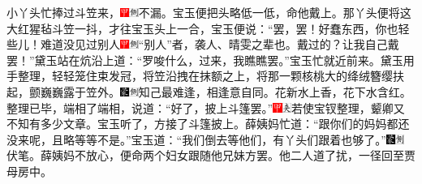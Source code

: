 小丫头忙捧过斗笠来，{\includegraphics[width=3mm]{../Images/00002}\includegraphics[width=3mm]{../Images/00011}\footnotesize \kaishu 不漏。}宝玉便把头略低一低，命他戴上。那丫头便将这大红猩毡斗笠一抖，才往宝玉头上一合，宝玉便说：“罢，罢！好蠢东西，你也轻些儿！难道没见过别人{\includegraphics[width=3mm]{../Images/00002}\includegraphics[width=3mm]{../Images/00011}\footnotesize \kaishu “别人”者，袭人、晴雯之辈也。}戴过的？让我自己戴罢！”黛玉站在炕沿上道：“罗唆什么，过来，我瞧瞧罢。”宝玉忙就近前来。黛玉用手整理，轻轻笼住束发冠，将笠沿拽在抹额之上，将那一颗核桃大的绛绒簪缨扶起，颤巍巍露于笠外。{\includegraphics[width=3mm]{../Images/00006}\includegraphics[width=3mm]{../Images/00011}\footnotesize \kaishu 知己最难逢，相逢意自同。花新水上香，花下水含红。}整理已毕，端相了端相，说道：“好了，披上斗篷罢。”{\includegraphics[width=3mm]{../Images/00002}\includegraphics[width=3mm]{../Images/00012}\footnotesize \kaishu 若使宝钗整理，颦卿又不知有多少文章。}宝玉听了，方接了斗篷披上。薛姨妈忙道：“跟你们的妈妈都还没来呢，且略等等不是。”宝玉道：“我们倒去等他们，有丫头们跟着也够了。”{\includegraphics[width=3mm]{../Images/00006}\includegraphics[width=3mm]{../Images/00011}\footnotesize \kaishu 伏笔。}薛姨妈不放心，便命两个妇女跟随他兄妹方罢。他二人道了扰，一径回至贾母房中。

